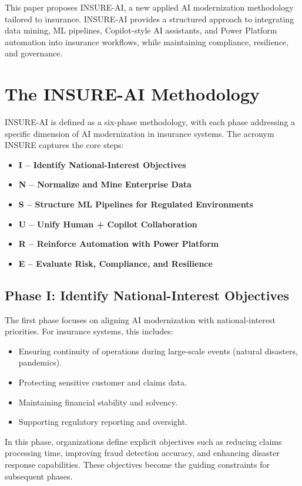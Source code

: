 \documentclass{article}
\begin{document}
This paper proposes INSURE-AI, a new applied AI modernization methodology tailored to insurance. INSURE-AI provides a structured approach to integrating data mining, ML pipelines, Copilot-style AI assistants, and Power Platform automation into insurance workflows, while maintaining compliance, resilience, and governance.

\section{The INSURE-AI Methodology}
INSURE-AI is defined as a six-phase methodology, with each phase addressing a specific dimension of AI modernization in insurance systems. The acronym INSURE captures the core steps:

\begin{itemize}
    \item \textbf{I -- Identify National-Interest Objectives}
    \item \textbf{N -- Normalize and Mine Enterprise Data}
    \item \textbf{S -- Structure ML Pipelines for Regulated Environments}
    \item \textbf{U -- Unify Human + Copilot Collaboration}
    \item \textbf{R -- Reinforce Automation with Power Platform}
    \item \textbf{E -- Evaluate Risk, Compliance, and Resilience}
\end{itemize}

\subsection{Phase I: Identify National-Interest Objectives}
The first phase focuses on aligning AI modernization with national-interest priorities. For insurance systems, this includes:

\begin{itemize}
    \item Ensuring continuity of operations during large-scale events (natural disasters, pandemics).
    \item Protecting sensitive customer and claims data.
    \item Maintaining financial stability and solvency.
    \item Supporting regulatory reporting and oversight.
\end{itemize}

In this phase, organizations define explicit objectives such as reducing claims processing time, improving fraud detection accuracy, and enhancing disaster response capabilities. These objectives become the guiding constraints for subsequent phases.
\end{document}
